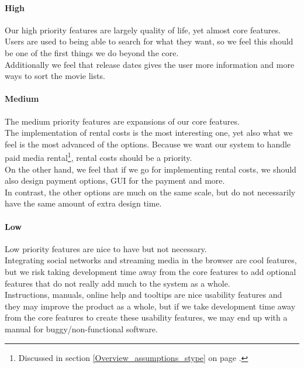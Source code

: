 \paragraph{High}
Our high priority features are largely quality of life, yet almost core features. Users are used to being able to search for what they want, so we feel this should be one of the first things we do beyond the core. 
\\Additionally we feel that release dates gives the user more information and more ways to sort the movie lists.

\paragraph{Medium}
The medium priority features are expansions of our core features. 
\\The implementation of rental costs is the most interesting one, yet also what we feel is the most advanced of the options. Because we want our system to handle paid media rental\footnote{Discussed in section \ref{Overview_assumptions_stype} on page \pageref{Overview_assumptions_stype}.}, rental costs should be a priority. 
\\On the other hand, we feel that if we go for implementing rental costs, we should also design payment options, GUI for the payment and more.
\\In contrast, the other options are much on the same scale, but do not necessarily have the same amount of extra design time.

\paragraph{Low}
Low priority features are nice to have but not necessary. 
\\Integrating social networks and streaming media in the browser are cool features, but we risk taking development time away from the core features to add optional features that do not really add much to the system as a whole.
\\Instructions, manuals, online help and tooltips are nice usability features and they may improve the product as a whole, but if we take development time away from the core features to create these usability features, we may end up with a manual for buggy/non-functional software.

